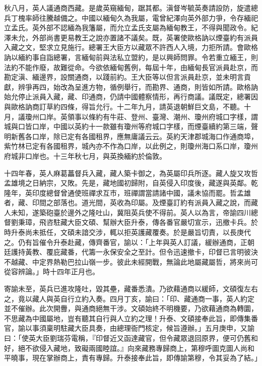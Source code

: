 \begin{pinyinscope}
秋八月，英人議通商西藏。是歲英窺緬甸，踞其都。滇督岑毓英奏請設防，旋遣總兵丁槐率師往騰越備之。中國以緬甸久為我屬，電曾紀澤向英外部力爭，令存緬祀立孟氏。英外部不認緬為我籓屬，而允立孟氏支屬為緬甸教王，不得與聞政令。紀澤未允，外部尚書更易教王之說亦置諸不議矣。既，英署使歐格訥以煙臺約有派員入藏之文，堅求立見施行。總署王大臣方以藏眾不許西人入境，力拒所請。會歐格訥以緬約事自詣總署，言緬甸前與法私立盟約，是以興師問罪。令若重立緬王，則法約不能作廢，故難從命。今欲依緬甸舊例，每屆十年，由緬甸長官派員赴京，而勘定滇、緬邊界，設關通商，以踐前約。王大臣等以但言派員赴京，並未明言貢獻，辨爭再四，始改為呈進方物，循例舉行，而勘界、通商，則皆如所請。歐格訥始允停止派員入藏，藏、印通商，仍請中國體察情形，再行商議。議既定，總署因與歐格訥商訂草約四條，得旨允行。十二年九月，請英退朝鮮巨文島，不聽。十月，議瓊州口岸。英領事以條約有牛莊、登州、臺灣、潮州、瓊州府城口字樣，謂城與口皆口岸，中國以英約十一款雖有瓊州等府城口字樣，而煙臺續約第三端，聲明新舊各口岸，除已定有各國租界，應無庸議云云。英約天津郡城海口作通商埠，紫竹林已定有各國租界，城內亦不作為口岸，以此例之，則瓊州海口系口岸，瓊州府城非口岸也。十三年秋七月，與英換緬約於倫敦。

十四年春，英人麻葛藟督兵入藏，藏人築卡御之，為英屬印兵所逐。藏人旋又攻哲孟雄境之日納宗，又敗。先是，藏地國初歸附，自英侵入印度後，藏遂與英鄰。乾隆年，英印度總督曾通使班禪求互市，班禪謂當請諸中國，議未協而罷。哲孟雄者，藏、印間之部落也。道光間，英收為印屬。及煙臺訂約有派員入藏之說，而藏人未知，遂築砲臺於邊外之隆吐山，冀阻英兵使不得前。英人以為言，帝諭四川總督劉秉璋，飛咨駐藏大臣文碩、幫辦大臣升泰，傳各番官嚴切宣示，迅撤卡兵。於時升泰尚未抵任，文碩未諳交涉，輒以拒英護藏覆奏。於是嚴旨切責，以長庚代之。仍有旨催令升泰赴藏，傳齊番官，諭以：「上年與英人訂議，緩辦通商，正朝廷護持黃教、覆庇藏番，代籌一永保安全之至計。但令迅速撤卡，印督已言明彼決不越藏、中定界熱勒巴拉山嶺一步。彼此未經開戰，無論此地屬藏屬哲，將來尚可從容辨論。」時十四年正月也。

寄諭未至，英兵已進攻隆吐，毀其壘，藏番悉潰。乃欲藉通商以緩師，文碩復左右之，竟以藏人與英自行立約入奏。四月丁亥，諭曰：「印、藏通商一事，英人約定並不催辦。此次開釁，與通商絕無干涉。文碩始終不明機要，乃欲藉通商為轉圜，不思藏為中國屬地，豈有聽其自行與人立約之理！升泰、文碩接奉此旨，即傳集番官，諭以事須稟明駐藏大臣具奏，由總理衙門核定，候旨遵辦。」五月庚申，又諭曰：「使英大臣劉瑞芬電稱，『印督近又函達藏官，但令藏眾退回原界，便可仍舊和好，絕不欲侵入藏地，致礙兩國睦誼。』向來藏務專歸商上，第穆呼圖克圖人尚和平曉事，現在掌辦商上，責有專歸。升泰接奉此旨，即傳諭第穆，令其妥為了結。」


\end{pinyinscope}
